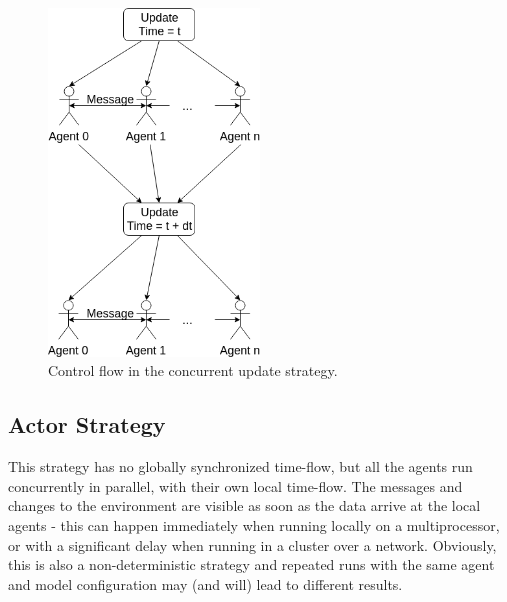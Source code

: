 \begin{figure}[H]
	\centering
	\includegraphics[width=0.5\textwidth, angle=0]{./fig/implabs/concurrent.png}
	\caption[Control flow in the concurrent update strategy]{Control flow in the concurrent update strategy.}
	\label{fig:strategy_conc}
\end{figure}

\subsection{Actor Strategy}
\label{sub:act_strategy}
This strategy has no globally synchronized time-flow, but all the agents run concurrently in parallel, with their own local time-flow. The messages and changes to the environment are visible as soon as the data arrive at the local agents - this can happen immediately when running locally on a multiprocessor, or with a significant delay when running in a cluster over a network. Obviously, this is also a non-deterministic strategy and repeated runs with the same agent and model configuration may (and will) lead to different results.

